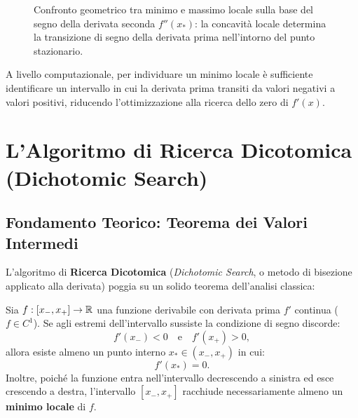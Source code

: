 \begin{figure}[H]
\caption{Confronto geometrico tra minimo e massimo locale sulla base del segno della derivata seconda $f''(x_*)$: la concavit\`a locale determina la transizione di segno della derivata prima nell'intorno del punto stazionario.}
\label{fig:first-second-order-conditions}
\end{figure}

A livello computazionale, per individuare un minimo locale \`e sufficiente identificare un intervallo in cui la derivata prima transiti da valori negativi a valori positivi, riducendo l'ottimizzazione alla ricerca dello zero di $f'(x)$.

\FloatBarrier
\section{L'Algoritmo di Ricerca Dicotomica (Dichotomic Search)}
\label{sec:univariata-ricerca-dicotomica}

\subsection{Fondamento Teorico: Teorema dei Valori Intermedi}
L'algoritmo di \textbf{Ricerca Dicotomica} (\textit{Dichotomic Search}, o metodo di bisezione applicato alla derivata) poggia su un solido teorema dell'analisi classica:

\begin{theorem}
Sia $f: [x_-, x_+] \to \mathbb{R}$ una funzione derivabile con derivata prima $f'$ continua ($f \in C^1$). Se agli estremi dell'intervallo sussiste la condizione di segno discorde:
\begin{equation}
    f'(x_-) < 0 \quad \text{e} \quad f'(x_+) > 0,
    \label{eq:condizione-bracketing-derivata}
\end{equation}
allora esiste almeno un punto interno $x_* \in (x_-, x_+)$ in cui:
\begin{equation}
    f'(x_*) = 0.
\end{equation}
Inoltre, poich\'e la funzione entra nell'intervallo decrescendo a sinistra ed esce crescendo a destra, l'intervallo $[x_-, x_+]$ racchiude necessariamente almeno un \textbf{minimo locale} di $f$.
\end{theorem}

